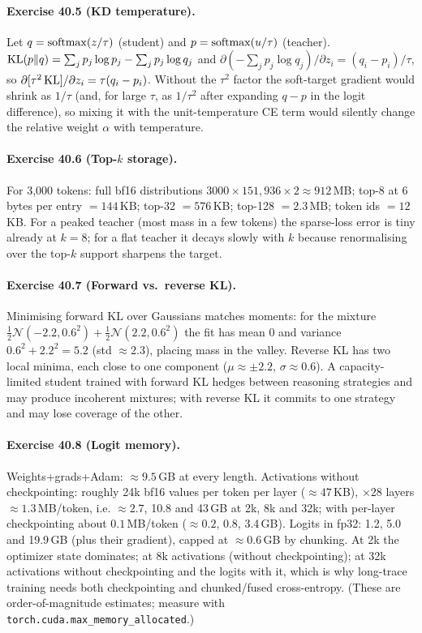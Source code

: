 \paragraph{Exercise 40.5 (KD temperature).}
Let $q=\operatorname{softmax}(z/\tau)$ (student) and $p=\operatorname{softmax}(u/\tau)$ (teacher). $\operatorname{KL}(p\|q)=\sum_j p_j\log
p_j-\sum_jp_j\log q_j$ and $\partial(-\sum_j p_j\log q_j)/\partial z_i=(q_i-p_i)/\tau$, so
$\partial[\tau^2\operatorname{KL}]/\partial z_i=\tau(q_i-p_i)$. Without the $\tau^2$ factor the soft-target
gradient would shrink as $1/\tau$ (and, for large $\tau$, as $1/\tau^2$ after expanding $q-p$ in
the logit difference), so mixing it with the unit-temperature CE term would silently change the
relative weight $\alpha$ with temperature.

\paragraph{Exercise 40.6 (Top-$k$ storage).}
For 3{,}000 tokens: full bf16 distributions $3000\times151{,}936\times2\approx912$\,MB; top-8 at 6
bytes per entry $=144$\,KB; top-32 $=576$\,KB; top-128 $=2.3$\,MB; token ids $=12$\,KB. For a peaked
teacher (most mass in a few tokens) the sparse-loss error is tiny already at $k=8$; for a flat
teacher it decays slowly with $k$ because renormalising over the top-$k$ support sharpens the
target.

\paragraph{Exercise 40.7 (Forward vs.\ reverse KL).}
Minimising forward KL over Gaussians matches moments: for the mixture $\tfrac12\mathcal N(-2.2,0.6^2)
+\tfrac12\mathcal N(2.2,0.6^2)$ the fit has mean 0 and variance $0.6^2+2.2^2=5.2$ (std $\approx2.3$),
placing mass in the valley. Reverse KL has two local minima, each close to one component
($\mu\approx\pm2.2$, $\sigma\approx0.6$). A capacity-limited student trained with forward KL
hedges between reasoning strategies and may produce incoherent mixtures; with reverse KL it commits
to one strategy and may lose coverage of the other.

\paragraph{Exercise 40.8 (Logit memory).}
Weights+grads+Adam: $\approx9.5$\,GB at every length. Activations without checkpointing: roughly 24k
bf16 values per token per layer ($\approx47$\,KB), $\times28$ layers $\approx1.3$\,MB/token, i.e.
$\approx2.7$, 10.8 and 43\,GB at 2k, 8k and 32k; with per-layer checkpointing about
$0.1$\,MB/token ($\approx0.2$, 0.8, 3.4\,GB). Logits in fp32: 1.2, 5.0 and 19.9\,GB (plus their
gradient), capped at $\approx0.6$\,GB by chunking. At 2k the optimizer state dominates; at 8k
activations (without checkpointing); at 32k activations without checkpointing and the logits with it,
which is why long-trace training needs both checkpointing and chunked/fused cross-entropy.
(These are order-of-magnitude estimates; measure with \texttt{torch.cuda.max\_memory\_allocated}.)

